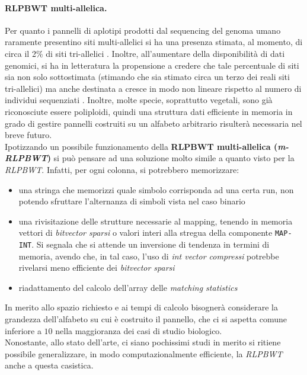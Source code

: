 \paragraph{RLPBWT multi-allelica.}
Per quanto i pannelli di aplotipi prodotti dal sequencing del genoma umano
raramente presentino siti multi-allelici si ha una presenza stimata, al momento,
di circa il 2\% di siti tri-allelici \cite{tri}. Inoltre, all'aumentare della
disponibilità di dati genomici, si ha in letteratura la propensione a credere
che tale percentuale di siti sia non solo sottostimata (stimando che sia stimato
circa un terzo dei reali siti tri-allelici) ma anche destinata a
cresce in modo non lineare rispetto al numero di individui sequenziati
\cite{tri2}. Inoltre, molte specie, soprattutto vegetali, sono già riconosciute
essere poliploidi, quindi una struttura dati efficiente in memoria in grado di
gestire pannelli costruiti su un alfabeto arbitrario risulterà necessaria nel
breve futuro.\\
Ipotizzando un possibile funzionamento della \textbf{RLPBWT
  multi-allelica (\textit{m-RLPBWT})} si può pensare ad una soluzione molto
simile a quanto visto per la \textit{RLPBWT}. Infatti, per ogni colonna, si
potrebbero memorizzare:
\begin{itemize}
  \item una stringa che memorizzi quale simbolo corrisponda ad una certa run,
  non potendo sfruttare l'alternanza di simboli vista nel caso binario
  \item una rivisitazione delle strutture necessarie al mapping, tenendo in
  memoria vettori di \textit{bitvector sparsi} o valori interi alla stregua
  della componente \texttt{MAP-INT}. Si segnala che si attende un inversione di
  tendenza in termini di memoria, avendo che, in tal caso, l'uso di \textit{int
    vector compressi} potrebbe rivelarsi meno efficiente dei \textit{bitvector
    sparsi} 
  \item riadattamento del calcolo dell'array delle \textit{matching statistics}
\end{itemize}
In merito allo spazio richiesto e ai tempi di calcolo bisognerà considerare la
grandezza dell'alfabeto su cui è costruito il pannello, che ci si aspetta comune
inferiore a $10$ nella maggioranza dei casi di studio biologico.\\
Nonostante, allo stato dell'arte, ci siano pochissimi studi in merito si ritiene
possibile generalizzare, in modo computazionalmente efficiente, la
\textit{RLPBWT} anche a questa casistica. 

